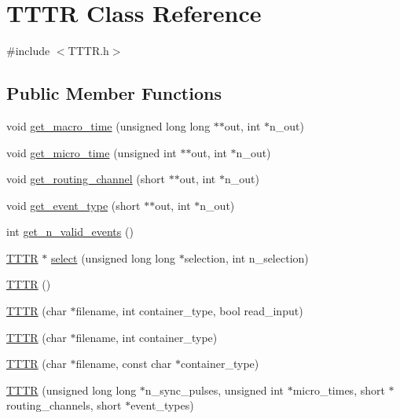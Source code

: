 \hypertarget{class_t_t_t_r}{}\section{T\+T\+TR Class Reference}
\label{class_t_t_t_r}


{\ttfamily \#include $<$T\+T\+T\+R.\+h$>$}

\subsection*{Public Member Functions}
\begin{DoxyCompactItemize}
\item 
void \hyperlink{class_t_t_t_r_abe71172a7c0339f09e336a0dcfb48e94}{get\+\_\+macro\+\_\+time} (unsigned long long $\ast$$\ast$out, int $\ast$n\+\_\+out)
\item 
void \hyperlink{class_t_t_t_r_af68c9a5a7c3ec01a5097864b4d97975a}{get\+\_\+micro\+\_\+time} (unsigned int $\ast$$\ast$out, int $\ast$n\+\_\+out)
\item 
void \hyperlink{class_t_t_t_r_a4171e1f0e8a709aae25cedbdd66a2bfb}{get\+\_\+routing\+\_\+channel} (short $\ast$$\ast$out, int $\ast$n\+\_\+out)
\item 
void \hyperlink{class_t_t_t_r_a449e92c3f30e013991cfdd1449aea609}{get\+\_\+event\+\_\+type} (short $\ast$$\ast$out, int $\ast$n\+\_\+out)
\item 
int \hyperlink{class_t_t_t_r_a500fa2f0fe263e7e309ed1c2be451114}{get\+\_\+n\+\_\+valid\+\_\+events} ()
\item 
\hyperlink{class_t_t_t_r}{T\+T\+TR} $\ast$ \hyperlink{class_t_t_t_r_aa9b6d4e201da050bf7ed1112c605ce72}{select} (unsigned long long $\ast$selection, int n\+\_\+selection)
\item 
\hyperlink{class_t_t_t_r_ad5537ce07845c94629ca3b88008a7597}{T\+T\+TR} ()
\item 
\hyperlink{class_t_t_t_r_af6cb99fa270ec32d7cd73211eb9a25eb}{T\+T\+TR} (char $\ast$filename, int container\+\_\+type, bool read\+\_\+input)
\item 
\hyperlink{class_t_t_t_r_acb25daf91a93eb600520c211d739f829}{T\+T\+TR} (char $\ast$filename, int container\+\_\+type)
\item 
\hyperlink{class_t_t_t_r_a5ebe9e8b44de5824c4a21e0d78497aba}{T\+T\+TR} (char $\ast$filename, const char $\ast$container\+\_\+type)
\item 
\hyperlink{class_t_t_t_r_aac095c4c7b20a7f682b1b487c9bf9bcd}{T\+T\+TR} (unsigned long long $\ast$n\+\_\+sync\+\_\+pulses, unsigned int $\ast$micro\+\_\+times, short $\ast$routing\+\_\+channels, short $\ast$event\+\_\+types)

\end{DoxyCompactItemize}
